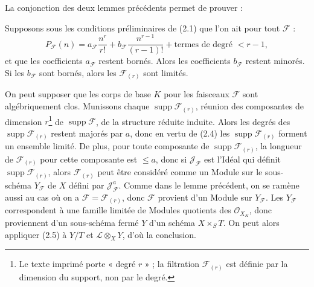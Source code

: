 La conjonction des deux lemmes précédents permet de prouver :

 Supposons sous les conditions préliminaires de (2.1) que
l'on ait pour tout $\mathcal F$ :
\[
P_{\mathcal F}(n)=a_{\mathcal F}\frac{n^r}{r!}
+b_{\mathcal F}\frac{n^{r-1}}{(r-1)!}
+\text{termes de degré $<r-1$},
\]
et que les coefficients $a_{\mathcal F}$ restent bornés. Alors les coefficients
$b_{\mathcal F}$ restent minorés. Si les $b_{\mathcal F}$ sont bornés, alors
les $\mathcal F_{(r)}$ sont limités.

On peut supposer que les corps de base $K$ pour les faisceaux $\mathcal F$ sont
algébriquement clos. Munissons chaque
$\operatorname{supp}\mathcal F_{(r)}$, réunion des composantes de dimension
$r$\footnote{Le texte imprimé porte « degré $r$ » ; la filtration
$\mathcal F_{(r)}$ est définie par la dimension du support, non par le degré.}
de $\operatorname{supp}\mathcal F$, de la structure réduite induite. Alors les
degrés des $\operatorname{supp}\mathcal F_{(r)}$ restent majorés par $a$, donc
en vertu de (2.4) les $\operatorname{supp}\mathcal F_{(r)}$ forment un ensemble
limité. De plus, pour toute composante de
$\operatorname{supp}\mathcal F_{(r)}$, la longueur de $\mathcal F_{(r)}$ pour
cette composante est $\leq a$, donc si $\mathcal J_{\mathcal F}$ est l'Idéal
qui définit $\operatorname{supp}\mathcal F_{(r)}$, alors $\mathcal F_{(r)}$
peut être considéré comme un Module sur le sous-schéma $Y_{\mathcal F}$ de $X$
défini par $\mathcal J_{\mathcal F}^{a}$. Comme dans le lemme précédent, on se
ramène aussi au cas où on a $\mathcal F=\mathcal F_{(r)}$, donc $\mathcal F$
provient d'un Module sur $Y_{\mathcal F}$. Les $Y_{\mathcal F}$ correspondent à
une famille limitée de Modules quotients des $\mathcal O_{X_K}$, donc
proviennent d'un sous-schéma fermé $Y$ d'un schéma $X\times_S T$. On peut alors
appliquer (2.5) à $Y/T$ et $\mathcal L\otimes_XY$, d'où la conclusion.

